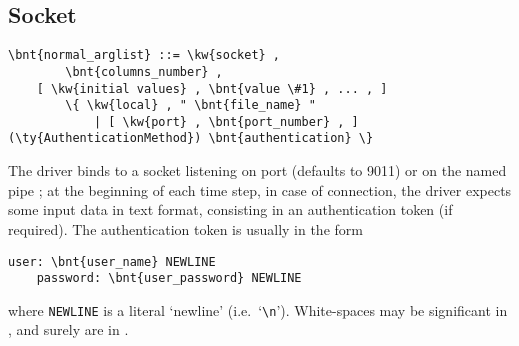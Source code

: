 \subsection{Socket}
\begin{Verbatim}[commandchars=\\\{\}]
    \bnt{normal_arglist} ::= \kw{socket} , 
        \bnt{columns_number} ,
	[ \kw{initial values} , \bnt{value \#1} , ... , ]
        \{ \kw{local} , " \bnt{file_name} " 
            | [ \kw{port} , \bnt{port_number} , ] (\ty{AuthenticationMethod}) \bnt{authentication} \}
\end{Verbatim}
The driver binds to a socket listening on port  
(defaults to 9011) or on the named pipe ; at the
beginning of each time step, in case of connection, the driver expects some
input data in text format, consisting in an authentication token 
(if required).
The authentication token is usually in the form
\begin{Verbatim}[commandchars=\\\{\}]
    user: \bnt{user_name} NEWLINE
    password: \bnt{user_password} NEWLINE
\end{Verbatim}
where \texttt{NEWLINE} is a literal `newline' (i.e.\ `\verb;\n;').
White-spaces may be significant in , 
and surely are in .


